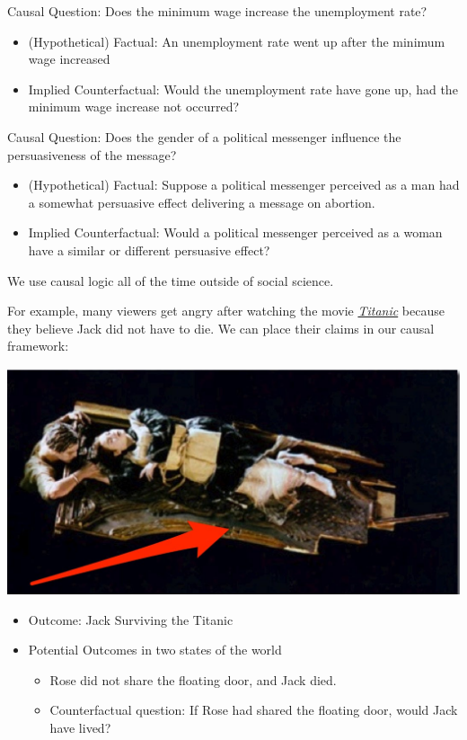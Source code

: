 \documentclass[
  letterpaper,
  DIV=11,
  numbers=noendperiod]{scrreprt}
\providecommand{\tightlist}{%
  \setlength{\itemsep}{0pt}\setlength{\parskip}{0pt}}\usepackage{longtable,booktabs,array}
\begin{document}
Causal Question: Does the minimum wage increase the unemployment rate?

\begin{itemize}
\tightlist
\item
  (Hypothetical) Factual: An unemployment rate went up after the minimum
  wage increased
\item
  Implied Counterfactual: Would the unemployment rate have gone up, had
  the minimum wage increase not occurred?
\end{itemize}

Causal Question: Does the gender of a political messenger influence the
persuasiveness of the message?

\begin{itemize}
\tightlist
\item
  (Hypothetical) Factual: Suppose a political messenger perceived as a
  man had a somewhat persuasive effect delivering a message on abortion.
\item
  Implied Counterfactual: Would a political messenger perceived as a
  woman have a similar or different persuasive effect?
\end{itemize}

We use causal logic all of the time outside of social science.

For example, many viewers get angry after watching the movie
\href{https://www.youtube.com/watch?v=3gK_2XdjOdY}{\emph{Titanic}}
because they believe Jack did not have to die. We can place their claims
in our causal framework:

\includegraphics{images/titanicdoor.jpeg}

\begin{itemize}
\tightlist
\item
  Outcome: Jack Surviving the Titanic
\item
  Potential Outcomes in two states of the world

  \begin{itemize}
  \tightlist
  \item
    Rose did not share the floating door, and Jack died.
  \item
    Counterfactual question: If Rose had shared the floating door, would
    Jack have lived?
  \end{itemize}
\end{itemize}
\end{document}
